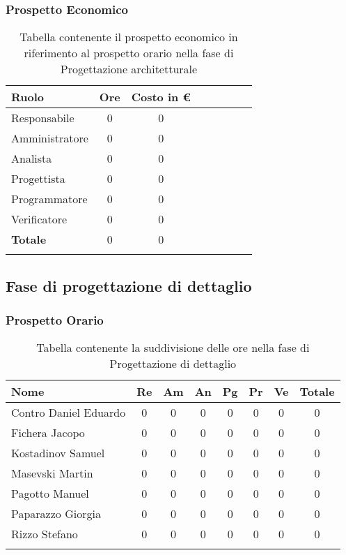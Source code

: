 \documentclass[../piano_di_progetto.tex]{subfiles}
\begin{document}
\subsubsection{Prospetto Economico}

\begin{center}
	\begin{longtable}{|l|c|c|c|c|c|c|c|}
		\hline
		\rowcolor{lightgray}
		\textbf{Ruolo} & \textbf{Ore} & \textbf{Costo in €}\\

		\hline
		Responsabile & 0 & 0\\
		\hline
		Amministratore & 0 & 0\\
		\hline
		Analista & 0 & 0\\
		\hline
		Progettista & 0 & 0\\
		\hline
		Programmatore & 0 & 0\\
		\hline
		Verificatore & 0 & 0\\
		\hline
		\textbf{Totale} & 0 & 0\\
		\hline
		\caption{Tabella contenente il prospetto economico in riferimento al prospetto orario nella fase di Progettazione architetturale}
	\end{longtable}
\end{center}

\subsection{ Fase di progettazione di dettaglio}%
\label{sub:fase_prog_dett}
\subsubsection{Prospetto Orario}

\begin{center}
	\begin{longtable}{|l|c|c|c|c|c|c|c|}
		\hline
		\rowcolor{lightgray}
		\textbf{Nome} & \textbf{Re} & \textbf{Am} & \textbf{An} & \textbf{Pg}  & \textbf{Pr}   & \textbf{Ve} & \textbf{Totale} \\

		\hline
			Contro Daniel Eduardo & 0 &0&0&0&0&0 & 0 \\
		\hline
			Fichera Jacopo &  0 &0&0&0&0&0 & 0 \\
		\hline
			Kostadinov Samuel &  0 &0&0&0&0&0 & 0 \\			
		\hline
			Masevski Martin 	&  0 &0&0&0&0&0 & 0\\
		\hline
			Pagotto Manuel &  0 &0&0&0&0&0 & 0 \\			
		\hline
			Paparazzo Giorgia &  0 &0&0&0&0&0 & 0 \\
		\hline
			Rizzo Stefano &  0 &0&0&0&0&0 & 0\\
		\hline	

		\caption{Tabella contenente la suddivisione delle ore nella fase di Progettazione di dettaglio}
	\end{longtable}
\end{center}
\end{document}
